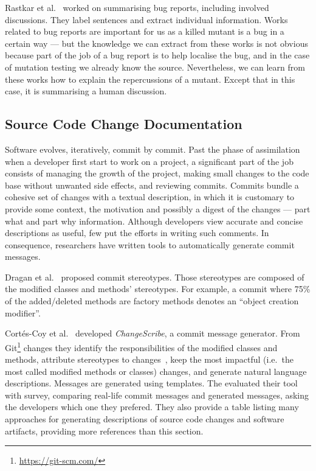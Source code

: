 \documentclass[a4paper,11pt]{sdm_internship}
\theoremstyle{definition}
\begin{document}
Rastkar et al.~\cite{rastkar2010summarizing} worked on summarising bug reports, including involved discussions.
They label sentences and extract individual information.
Works related to bug reports are important for us as a killed mutant is a bug in a certain way --- but the knowledge we can extract from these works is not obvious because part of the job of a bug report is to help localise the bug, and in the case of mutation testing we already know the source.
Nevertheless, we can learn from these works how to explain the repercussions of a mutant.
Except that in this case, it is summarising a human discussion.

\subsection{Source Code Change Documentation}%
\label{ssec:commit_generation}
Software evolves, iteratively, commit by commit.
Past the phase of assimilation when a developer first start to work on a project, a significant part of the job consists of managing the growth of the project, making small changes to the code base without unwanted side effects, and reviewing commits.
Commits bundle a cohesive set of changes with a textual description, in which it is customary to provide some context, the motivation and possibly a digest of the changes --- part what and part why information.
Although developers view accurate and concise descriptions as useful, few put the efforts in writing such comments.
In consequence, researchers have written tools to automatically generate commit messages.

Dragan et al.~\cite{dragan2011using} proposed commit stereotypes.
Those stereotypes are composed of the modified classes and methods' stereotypes.
For example, a commit where 75\% of the added/deleted methods are factory methods denotes an ``object creation modifier''.

Cort\'es-Coy et al.~\cite{cortes2014automatically,linares2015changescribe} developed \textit{ChangeScribe}, a commit message generator.
From Git\footnote{\url{https://git-scm.com/}} changes they identify the responsibilities of the modified classes and methods, attribute stereotypes to changes~\cite{dragan2011using}, keep the most impactful (i.e.\ the most called modified methods or classes) changes, and generate natural language descriptions.
Messages are generated using templates.
The evaluated their tool with survey, comparing real-life commit messages and generated messages, asking the developers which one they prefered.
They also provide a table listing many approaches for generating descriptions of source code changes and software artifacts, providing more references than this section.
\end{document}

